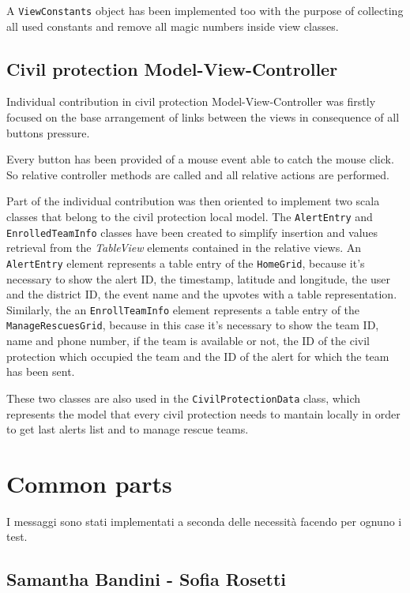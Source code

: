 \documentclass[a4paper,12pt]{report}
\begin{document}
A \texttt{ViewConstants} object has been implemented too with the purpose of collecting all used constants and remove all magic numbers inside view classes.

\subsection{Civil protection Model-View-Controller}
Individual contribution in civil protection Model-View-Controller was firstly focused on the base arrangement of links between the views in consequence of all buttons pressure.

Every button has been provided of a mouse event able to catch the mouse click. So relative controller methods are called and all relative actions are performed.

Part of the individual contribution was then oriented to implement two scala classes that belong to the civil protection local model.
The \texttt{AlertEntry} and \texttt{EnrolledTeamInfo} classes have been created to simplify insertion and values retrieval from the \textit{TableView} elements contained in the relative views. An \texttt{AlertEntry} element represents a table entry of the \texttt{HomeGrid}, because it's necessary to show the alert ID, the timestamp, latitude and longitude, the user and the district ID, the event name and the upvotes with a table representation. Similarly, the an \texttt{EnrollTeamInfo} element represents a table entry of the \texttt{ManageRescuesGrid}, because in this case it's necessary to show the team ID, name and phone number, if the team is available or not, the ID of the civil protection which occupied the team and the ID of the alert for which the team has been sent.

These two classes are also used in the \texttt{CivilProtectionData} class, which represents the model that every civil protection needs to mantain locally in order to get last alerts list and to manage rescue teams.

\section{Common parts}
I messaggi sono stati implementati a seconda delle necessità facendo per ognuno i test.

\subsection{Samantha Bandini - Sofia Rosetti}
\end{document}
